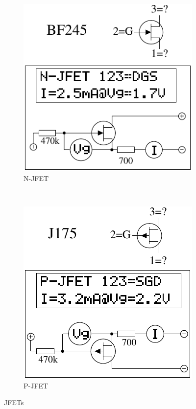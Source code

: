 \begin{figure}[H]
  \begin{subfigure}[b]{.5\textwidth}
    \centering
    \includegraphics[width=1.\textwidth]{../FIG/JFET_BF245.pdf}
    \caption{N-JFET}
    \label{fig:N-JFET}
  \end{subfigure}
  ~
  \begin{subfigure}[b]{.5\textwidth}
    \centering
    \includegraphics[width=1.\textwidth]{../FIG/JFET_J175.pdf}
    \caption{P-JFET}
    \label{fig:P-JFET}
  \end{subfigure}
  \caption{JFETs}
\end{figure}



